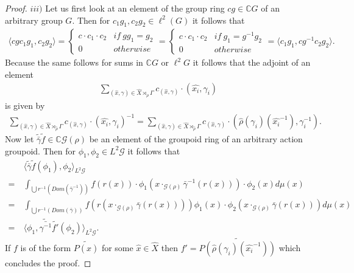 \documentclass[12pt,a4paper]{scrartcl}
\theoremstyle{plain}
\theoremstyle{definition}
\numberwithin{equation}{section}
\newcommand{\C}{\mathbb{C}} %
\newcommand{\2}{\mathbb{Z} / 2 \mathbb{Z}}
\newcommand{\G}{\mathcal{G}}
\newcommand{\1}{\bar{1}}
\newcommand{\0}{\bar{0}}
\begin{document}
\begin{proof}
	$iii)$ Let us first look at an element of the group ring $c g \in \C G$ of an arbitrary group $G$. Then for $c_1 g_1, c_2 g_2 \in \ell^2(G)$ it follows that 
	\begin{align*}
		\langle c g c_1 g_1, c_2 g_2 \rangle = \begin{cases}
		 	c \cdot c_1 \cdot c_2 & if \ g g_1 = g_2 \\
		 	0 & otherwise
		\end{cases}  = \begin{cases}
		c \cdot c_1 \cdot c_2 & if \ g_1 = g^{-1} g_2 \\
		0 & otherwise
		\end{cases}
		= \langle  c_1 g_1, c g^{-1} c_2 g_2 \rangle.
	\end{align*}
	Because the same follows for sums in $\C G$ or $\ell^2 G$ it follows that the adjoint of an element 
	\begin{align*}
		\sum_{(\hat{x}, \gamma) \in \hat{X} \rtimes_{\hat{\rho}} \Gamma} c_{(\hat{x}, \gamma)} \cdot (\hat{x_i}, \gamma_i)
	\end{align*}
	is given by 
	\begin{align*}
		\sum_{(\hat{x}, \gamma) \in \hat{X} \rtimes_{\hat{\rho}} \Gamma} c_{(\hat{x}, \gamma)} \cdot (\hat{x_i}, \gamma_i)^{-1} = \sum_{(\hat{x}, \gamma) \in \hat{X} \rtimes_{\hat{\rho}} \Gamma} c_{(\hat{x}, \gamma)} \cdot (\hat{\rho}(\gamma_i)(\hat{x_i}^{-1}), \gamma_i^{-1}).
	\end{align*}
	Now let $\tilde{\bar{\gamma}} \tilde{f} \in \C \G(\rho)$ be an element of the groupoid ring of an arbitrary action groupoid. Then for $\phi_1, \phi_2 \in L^2 \G$ it follows that
	\begin{align*}
		 &~ \langle \tilde{\bar{\gamma}} \tilde{f} (\phi_1), \phi_2 \rangle_{L^2 \G} \\
		=&~ \int_{\bigcup r^{-1}(Dom(\bar{\gamma}^{-1}))} f(r(x)) \cdot \phi_1(x \cdot_{\G (\rho)} \bar{\gamma}^{-1}(r(x))) \cdot \phi_2 (x) d \mu (x) \\
		=&~ \int_{\bigcup r^{-1}(Dom(\bar{\gamma}))} f(r(x \cdot_{\G (\rho)} \bar{\gamma}(r(x)))) \phi_1(x ) \cdot \phi_2 (x \cdot_{\G (\rho)} \bar{\gamma}(r(x))) d \mu (x) \\
		=&~ \langle \phi_1 ,\tilde{\bar{\gamma^{-1}}} \tilde{f'} (\phi_2) \rangle_{L^2 \G}.
	\end{align*} 
	If $f$ is of the form $\widetilde{P(\hat{x})}$ for some $\hat{x} \in \hat{X}$ then $f' = \widetilde{P(\hat{\rho}(\gamma_i)(\hat{x_i}^{-1}))}$  which concludes the proof.
\end{proof}
\end{document}
